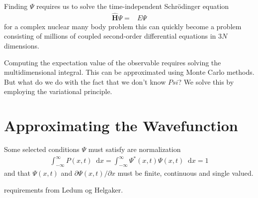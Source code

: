 \documentclass[twoside,english]{uiofysmaster}
\newcommand*\dif{\mathop{}\!\mathrm{d}}
\begin{document}
Finding $\Psi$ requires us to solve the time-independent Schrödinger equation
\begin{align}
	\hat{\bm{H}} \Psi =& E\Psi 
\end{align}
for a complex nuclear many body problem this can quickly become a problem consisting of millions of coupled second-order differential equations in $3N$ dimensions.

Computing the expectation value of the observable requires solving the multidimensional integral. This can be approximated using Monte Carlo methods. But what do we do with the fact that we don't know $Psi$? We solve this by employing the variational principle.

\section{Approximating the Wavefunction}
Some selected conditions $\Psi$ must satisfy \cite{HjortJensen2015} are normalization 
\begin{align}
	\int_{-\infty}^{\infty} P(x,t) \dif x = \int_{-\infty}^{\infty} \Psi^{\ast}(x,t) \Psi (x,t) \dif x = 1
\end{align}
and that $\Psi (x,t)$ and $\partial \Psi(x,t) / \partial x$ must be finite, continuous and single valued.


requirements from Ledum og Helgaker.
\end{document}
